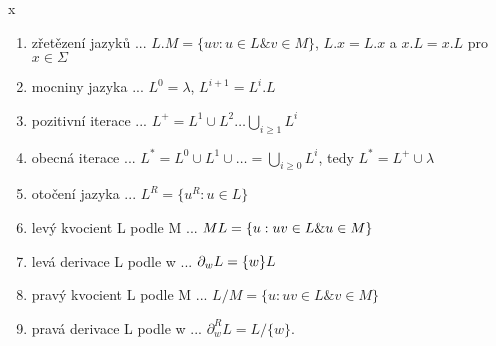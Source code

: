 \documentclass[../main.tex]{subfiles}
\begin{document}
\begin{definition}
    {\color{white} x}

    \begin{enumerate}
        \item zřetězení jazyků ... $L.M = \{uv : u \in L \& v \in M\}$, $L.x = L.{x}$ a $x.L = {x}.L$ pro $x \in \Sigma$
        \item mocniny jazyka ... $L^0 = {\lambda}$, $L^{i+1} = L^i.L$
        \item pozitivní iterace ... $L^+ = L^1 \cup L^2 \dots \bigcup_{i\geq 1} L^i$
        \item obecná iterace ... $L^* = L^0 \cup L^1 \cup \dots = \bigcup_{i\geq 0}L^i$, tedy $L^* = L^+ \cup {\lambda}$
        \item otočení jazyka ... $L^R = \{u^R : u\in L\}$
        \item levý kvocient L podle M ... $M\\L = \{u : uv \in L \& u\in M\}$
        \item levá derivace L podle w ... $\partial_wL = \{w\}\\ L$
        \item pravý kvocient L podle M ... $L/M = \{u: uv \in L \& v \in M\}$
        \item pravá derivace L podle w ... $\partial^R_wL=L/\{w\}$.
    \end{enumerate}
\end{definition}
\end{document}
